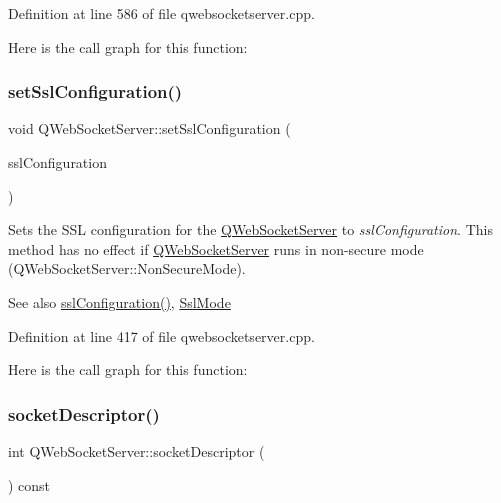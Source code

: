 Definition at line 586 of file qwebsocketserver.\+cpp.

Here is the call graph for this function\+:
\mbox{\label{class_q_web_socket_server_a543df52afcb224e3bd8c32b02f757de9}} 
\subsubsection{\texorpdfstring{set\+Ssl\+Configuration()}{setSslConfiguration()}}
{\footnotesize\ttfamily void Q\+Web\+Socket\+Server\+::set\+Ssl\+Configuration (\begin{DoxyParamCaption}\item[{const Q\+Ssl\+Configuration \&}]{ssl\+Configuration }\end{DoxyParamCaption})}

Sets the S\+SL configuration for the \mbox{\hyperlink{class_q_web_socket_server}{Q\+Web\+Socket\+Server}} to {\itshape ssl\+Configuration}. This method has no effect if \mbox{\hyperlink{class_q_web_socket_server}{Q\+Web\+Socket\+Server}} runs in non-\/secure mode (Q\+Web\+Socket\+Server\+::\+Non\+Secure\+Mode).

\begin{DoxySeeAlso}{See also}
\mbox{\hyperlink{class_q_web_socket_server_ae1f454fd2ce66388241f8b7acb680ad5}{ssl\+Configuration()}}, \mbox{\hyperlink{class_q_web_socket_server_a07ce392fd4fa351746e48b00428366b8}{Ssl\+Mode}} 
\end{DoxySeeAlso}


Definition at line 417 of file qwebsocketserver.\+cpp.

Here is the call graph for this function\+:
\mbox{\label{class_q_web_socket_server_a3b83cfc7602ecd27ca21a1ec80220dc0}} 
\subsubsection{\texorpdfstring{socket\+Descriptor()}{socketDescriptor()}}
{\footnotesize\ttfamily int Q\+Web\+Socket\+Server\+::socket\+Descriptor (\begin{DoxyParamCaption}{ }\end{DoxyParamCaption}) const}

